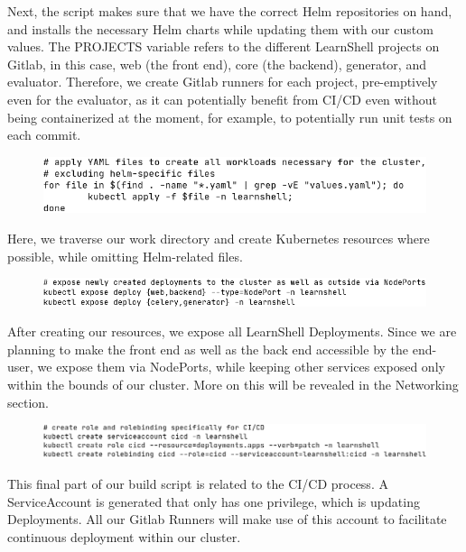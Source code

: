 \documentclass[thesis=B,english]{FITthesis}[2019/12/23]
\begin{document}
Next, the script makes sure that we have the correct Helm repositories on hand, and installs the necessary Helm charts while updating them with our custom values. The PROJECTS variable refers to the different LearnShell projects on Gitlab, in this case, web (the front end), core (the backend), generator, and evaluator. Therefore, we create Gitlab runners for each project, pre-emptively even for the evaluator, as it can potentially benefit from CI/CD even without being containerized at the moment, for example, to potentially run unit tests on each commit.

\begin{figure}[H]
\centering
\hspace*{-1.5cm}
\includegraphics[scale=0.5]{build-kube1}
\end{figure}

Here, we traverse our work directory and create Kubernetes resources where possible, while omitting Helm-related files. 

\begin{figure}[H]
\centering
\hspace*{-0.5cm}
\includegraphics[scale=0.5]{build-kube2}
\end{figure}

After creating our resources, we expose all LearnShell Deployments. Since we are planning to make the front end as well as the back end accessible by the end-user, we expose them via NodePorts, while keeping other services exposed only within the bounds of our cluster. More on this will be revealed in the Networking section.

\begin{figure}[H]
\centering
\hspace*{-0.5cm}
\includegraphics[scale=0.5]{build-kube3}
\end{figure}

This final part of our build script is related to the CI/CD process. A ServiceAccount is generated that only has one privilege, which is updating Deployments. All our Gitlab Runners will make use of this account to facilitate continuous deployment within our cluster.
\end{document}
